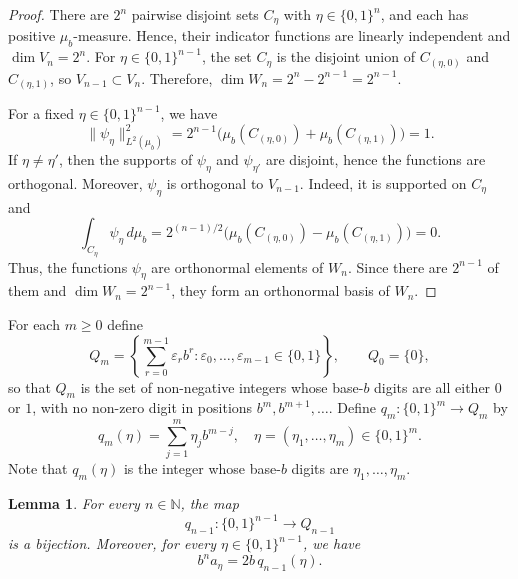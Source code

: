\documentclass[reqno,a4paper,12pt]{amsart}
\newtheorem{lemma}[definition]{Lemma}
\def\N{{\mathbb N}}
\begin{document}
\begin{proof}
There are $2^n$ pairwise disjoint sets $C_\eta$ with
$\eta\in\{0,1\}^n$, and each has positive $\mu_b$-measure. Hence, their
indicator functions are linearly independent and $\dim V_n=2^n$. For
$\eta\in\{0,1\}^{n-1}$, the set $C_\eta$ is the disjoint union of
$C_{(\eta,0)}$ and $C_{(\eta,1)}$, so $V_{n-1}\subset V_n$. Therefore,
$\dim W_n=2^n-2^{n-1}=2^{n-1}$.

For a fixed $\eta\in\{0,1\}^{n-1}$, we have
$$
        \|\psi_\eta\|_{L^2(\mu_b)}^2
        =
        2^{n-1}\bigl(\mu_b(C_{(\eta,0)})+\mu_b(C_{(\eta,1)})\bigr)
        =
        1.
$$
If $\eta\ne\eta'$, then the supports of $\psi_\eta$ and
$\psi_{\eta'}$ are disjoint, hence the functions are orthogonal. Moreover,
$\psi_\eta$ is orthogonal to $V_{n-1}$. Indeed, it is supported on
$C_\eta$ and
$$
        \int_{C_\eta}\psi_\eta\,d\mu_b
        =
        2^{(n-1)/2}
        \bigl(\mu_b(C_{(\eta,0)})-\mu_b(C_{(\eta,1)})\bigr)
        =
        0.
$$
Thus, the functions $\psi_\eta$ are orthonormal elements of $W_n$. Since
there are $2^{n-1}$ of them and $\dim W_n=2^{n-1}$, they form an
orthonormal basis of $W_n$.
\end{proof}

For each $m\ge0$ define
$$
        Q_m=
        \left\{
        \sum_{r=0}^{m-1}\varepsilon_r b^r:
        \varepsilon_0,\ldots,\varepsilon_{m-1}\in\{0,1\}
        \right\},
        \qquad Q_0=\{0\},
$$
so that $Q_m$ is the set of non-negative integers whose base-$b$ digits are
all either $0$ or $1$, with no non-zero digit in positions
$b^m,b^{m+1},\ldots$. Define $q_m:\{0,1\}^m\to Q_m$ by
$$
        q_m(\eta)
        =
        \sum_{j=1}^{m}\eta_j b^{m-j}
        , \quad \eta=(\eta_1,\ldots,\eta_m)\in\{0,1\}^m.
$$
Note that $q_m(\eta)$ is the integer whose base-$b$ digits are
$\eta_1,\ldots,\eta_m$.

\begin{lemma}\label{lma:q}
For every $n\in\N$, the map
\[
        q_{n-1} :\{0,1\}^{n-1}\to Q_{n-1}
\]
is a bijection. Moreover, for every $\eta\in\{0,1\}^{n-1}$, we have
\[
        b^n a_\eta=2b\,q_{n-1}(\eta).
\]
\end{lemma}
\end{document}
